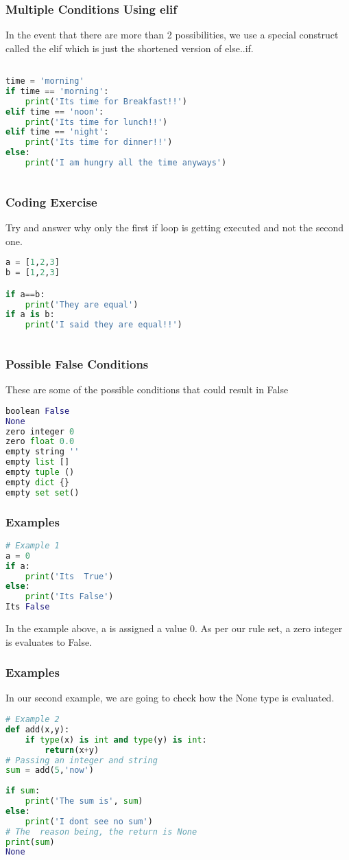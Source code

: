 \documentclass{beamer}
\begin{document}
\begin{frame}[fragile]
\frametitle{Multiple Conditions Using elif}
In the event that there are more than 2 possibilities, we use a special construct called the elif which is just the shortened version of else..if.
\begin{lstlisting}[language=Python]

time = 'morning'
if time == 'morning':
    print('Its time for Breakfast!!')
elif time == 'noon':
    print('Its time for lunch!!')
elif time == 'night':
    print('Its time for dinner!!')
else:
    print('I am hungry all the time anyways')
	
\end{lstlisting}
\end{frame}

\begin{frame}[fragile]
\frametitle{Coding Exercise}
Try and answer why only the first if loop is getting executed and not the second one.
\begin{lstlisting}[language=Python]
a = [1,2,3]
b = [1,2,3]

if a==b:
    print('They are equal')
if a is b:
    print('I said they are equal!!')
	
\end{lstlisting}
\end{frame}


\begin{frame}[fragile]
\frametitle{Possible False Conditions}
These are some of the possible conditions that could result in False
\begin{lstlisting}[language=Python]
boolean False
None
zero integer 0
zero float 0.0
empty string ''
empty list []
empty tuple ()
empty dict {}
empty set set()
\end{lstlisting}
\end{frame}

\begin{frame}[fragile]
\frametitle{Examples}
\begin{lstlisting}[language=Python]
# Example 1
a = 0
if a:
	print('Its  True')
else:
	print('Its False')
Its False
\end{lstlisting}
In the example above, a is assigned a value 0.
As per our rule set, a zero integer is evaluates to False.
\end{frame}

\begin{frame}[fragile]
\frametitle{Examples}
In our second example, we are going to check how the None type is evaluated.
\begin{lstlisting}[language=Python]
# Example 2
def add(x,y):
    if type(x) is int and type(y) is int:
        return(x+y)
# Passing an integer and string        
sum = add(5,'now') 
    
if sum:
    print('The sum is', sum)
else:
    print('I dont see no sum')
# The  reason being, the return is None
print(sum)
None
\end{lstlisting}
\end{frame}
\end{document}
